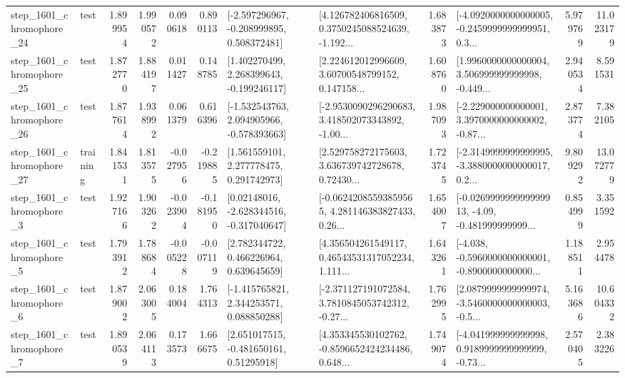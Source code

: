 \begin{tabular}{llrrrrllrlrr}
 step\_1601\_chromophore\_24 &      test &      1.899954 &    1.990572 &      0.090618 &  0.890113 &   [-2.597296967, -0.208999895, 0.508372481] &  [4.126782406816509, 0.3750245088524639, -1.192... &       1.683873 &  [-4.0920000000000005, -0.2459999999999951, 0.3... &            5.979769 &         11.023179 \\
 step\_1601\_chromophore\_25 &      test &      1.872770 &    1.884197 &      0.011427 &  0.148785 &    [1.402270499, 2.268399643, -0.199246117] &  [2.224612012996609, 3.60700548799152, 0.147158... &       1.608760 &  [1.9960000000000004, 3.506999999999998, -0.449... &            2.940534 &          8.591531 \\
 step\_1601\_chromophore\_26 &      test &      1.877614 &    1.938992 &      0.061379 &  0.616396 &   [-1.532543763, 2.094905966, -0.578393663] &  [-2.9530090296290683, 3.418502073343892, -1.00... &       1.987093 &  [-2.229000000000001, 3.3970000000000002, -0.87... &            2.873774 &          7.382105 \\
 step\_1601\_chromophore\_27 &  training &      1.841531 &    1.813575 &     -0.027956 & -0.219885 &     [1.561559101, 2.277778475, 0.291742973] &  [2.529758272175603, 3.636739742728678, 0.72430... &       1.723745 &  [-2.3149999999999995, -3.3880000000000017, 0.2... &            9.809292 &         13.072779 \\
  step\_1601\_chromophore\_3 &      test &      1.927166 &    1.903262 &     -0.023904 & -0.181950 &    [0.02148016, -2.628344516, -0.317040647] &  [-0.06242085593859565, 4.281146383827433, 0.26... &       1.654007 &  [-0.026999999999999913, -4.09, -0.481999999999... &            0.854999 &          3.351592 \\
  step\_1601\_chromophore\_5 &      test &      1.793912 &    1.788684 &     -0.005228 & -0.007119 &     [2.782344722, 0.466226964, 0.639645659] &  [4.356504261549117, 0.46543531317052234, 1.111... &       1.643261 &  [-4.038, -0.5960000000000001, -0.8900000000000... &            1.188511 &          2.954478 \\
  step\_1601\_chromophore\_6 &      test &      1.879002 &    2.063005 &      0.184004 &  1.764313 &    [-1.415765821, 2.344253571, 0.088850288] &  [-2.371127191072584, 3.7810845053742312, -0.27... &       1.762995 &  [2.0879999999999974, -3.5460000000000003, -0.5... &            5.163686 &         10.604332 \\
  step\_1601\_chromophore\_7 &      test &      1.890539 &    2.064113 &      0.173573 &  1.666675 &     [2.651017515, -0.481650161, 0.51295918] &  [4.353345530102762, -0.8596652424234486, 0.648... &       1.749074 &  [-4.041999999999998, 0.9189999999999999, -0.73... &            2.570405 &          2.383226 \\

\end{tabular}
